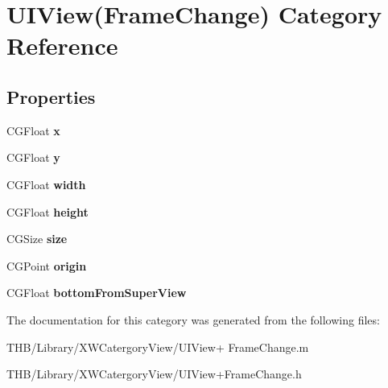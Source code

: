 \hypertarget{category_u_i_view_07_frame_change_08}{}\section{U\+I\+View(Frame\+Change) Category Reference}
\label{category_u_i_view_07_frame_change_08}
\subsection*{Properties}
\begin{DoxyCompactItemize}
\item 
\mbox{\label{category_u_i_view_07_frame_change_08_a92f83a02144b26a52b1b79a7a1b15844}} 
C\+G\+Float {\bfseries x}
\item 
\mbox{\label{category_u_i_view_07_frame_change_08_aa27450edfe289146290cb77ec21f6822}} 
C\+G\+Float {\bfseries y}
\item 
\mbox{\label{category_u_i_view_07_frame_change_08_a9e78e562be6901a97bd349b9e4639d80}} 
C\+G\+Float {\bfseries width}
\item 
\mbox{\label{category_u_i_view_07_frame_change_08_a059f8b02c6efb6a555c70113e5590fd8}} 
C\+G\+Float {\bfseries height}
\item 
\mbox{\label{category_u_i_view_07_frame_change_08_a22f0325880edd44233012a8e0250ab33}} 
C\+G\+Size {\bfseries size}
\item 
\mbox{\label{category_u_i_view_07_frame_change_08_a494f017adc9171cc22dffc114322d3fc}} 
C\+G\+Point {\bfseries origin}
\item 
\mbox{\label{category_u_i_view_07_frame_change_08_a0eb046b7ea0f7c83f18ddd2c9550667d}} 
C\+G\+Float {\bfseries bottom\+From\+Super\+View}
\end{DoxyCompactItemize}


The documentation for this category was generated from the following files\+:\begin{DoxyCompactItemize}
\item 
T\+H\+B/\+Library/\+X\+W\+Catergory\+View/U\+I\+View+ Frame\+Change.\+m\item 
T\+H\+B/\+Library/\+X\+W\+Catergory\+View/U\+I\+View+\+Frame\+Change.\+h\end{DoxyCompactItemize}
